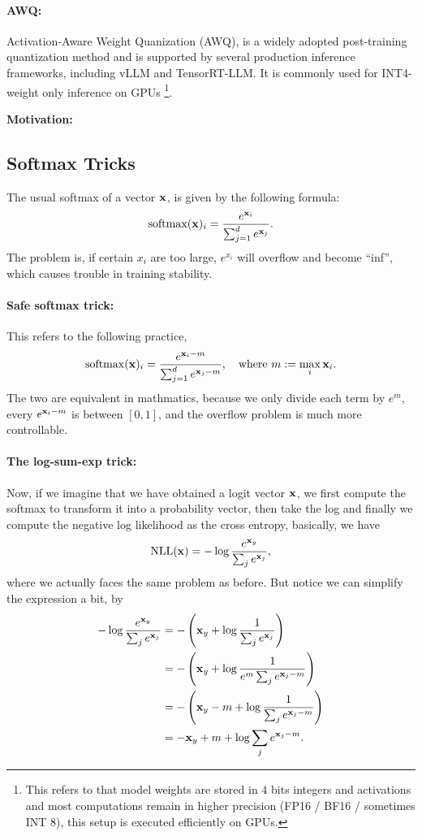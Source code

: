 \documentclass[11pt]{article}  %
\begin{document}
\paragraph{AWQ:}
Activation-Aware Weight Quanization (AWQ), is a widely adopted post-training quantization method and is supported by several production inference frameworks, including vLLM and TensorRT-LLM.
It is commonly used for INT4-weight only inference on GPUs \footnote{This refers to that model weights are stored in $4$ bits integers and activations and most computations remain in higher precision (FP16 / BF16 / sometimes INT 8), this setup is executed efficiently on GPUs.}.

\textbf{Motivation:}

\subsection{Softmax Tricks}
The usual softmax of a vector $\mathbf{x}$, is given by the following formula:
\begin{align*}
  \operatorname{softmax}(\mathbf{x})_i = \frac{e^{\mathbf{x}_i}}{\sum_{j=1}^{d} e^{\mathbf{x}_j}}.
\end{align*}
The problem is, if certain $x_i$ are too large, $e^{x_i}$ will overflow and become ``inf'', which causes trouble in training stability.

\paragraph{Safe softmax trick:} This refers to the following practice, 
\begin{align*}
  \operatorname{softmax}(\mathbf{x})_i = \frac{e^{\mathbf{x}_i - m}}{\sum_{j=1}^{d} e^{\mathbf{x}_j - m}}, \quad \text{where  } m := \max_i \mathbf{x}_i.
\end{align*}
The two are equivalent in mathmatics, because we only divide each term by $e^m$, every $e^{\mathbf{x}_i - m}$ is between $[0, 1]$, and the overflow problem is much more controllable.

\paragraph{The log-sum-exp trick:}
Now, if we imagine that we have obtained a logit vector $\mathbf{x}$, we first compute the softmax to transform it into a probability vector, then take the log and finally we compute the negative log likelihood as the cross entropy, basically, we have 
\begin{align*}
  \operatorname{NLL}(\mathbf{x}) = - \log \frac{e^{\mathbf{x}_y}}{\sum_j e^{\mathbf{x}_j}},
\end{align*}
where we actually faces the same problem as before.
But notice we can simplify the expression a bit, by 
\begin{align*}
  - \log \frac{e^{\mathbf{x}_y}}{\sum_j e^{\mathbf{x}_j}} &= - \left( \mathbf{x}_y + \log\frac{1}{\sum_j e^{\mathbf{x}_j}} \right) \\
  &= -\left( \mathbf{x}_y + \log\frac{1}{e^{m}\sum_j e^{\mathbf{x}_j - m}} \right) \\
  &= -\left( \mathbf{x}_y - m + \log \frac{1}{\sum_j e^{\mathbf{x}_j - m}} \right) \\
  &= -\mathbf{x}_y + m + \log \sum_j e^{\mathbf{x}_j - m}.
\end{align*}
\end{document}
